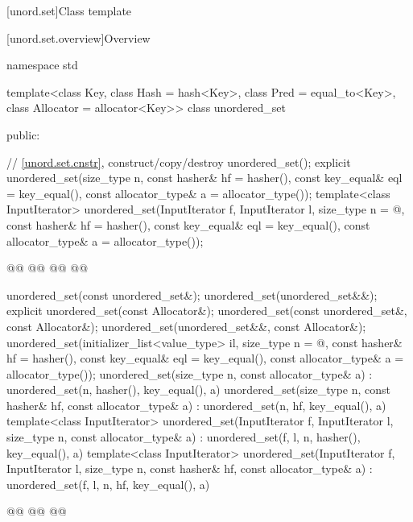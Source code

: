 \documentclass{wg21}
\begin{document}
[unord.set]{Class template }%

[unord.set.overview]{Overview}

%
\begin{codeblock}
namespace std {
template<class Key,
class Hash = hash<Key>,
class Pred = equal_to<Key>,
class Allocator = allocator<Key>>
class unordered_set {
    public:

    // \ref{unord.set.cnstr}, construct/copy/destroy
    unordered_set();
    explicit unordered_set(size_type n,
    const hasher& hf = hasher(),
    const key_equal& eql = key_equal(),
    const allocator_type& a = allocator_type());
    template<class InputIterator>
    unordered_set(InputIterator f, InputIterator l,
        size_type n = @\seebelow@,
        const hasher& hf = hasher(),
        const key_equal& eql = key_equal(),
        const allocator_type& a = allocator_type());

    @@
    @@
    @@
    @@

    unordered_set(const unordered_set&);
    unordered_set(unordered_set&&);
    explicit unordered_set(const Allocator&);
    unordered_set(const unordered_set&, const Allocator&);
    unordered_set(unordered_set&&, const Allocator&);
    unordered_set(initializer_list<value_type> il,
        size_type n = @\seebelow@,
        const hasher& hf = hasher(),
        const key_equal& eql = key_equal(),
        const allocator_type& a = allocator_type());
    unordered_set(size_type n, const allocator_type& a)
    : unordered_set(n, hasher(), key_equal(), a) { }
    unordered_set(size_type n, const hasher& hf, const allocator_type& a)
    : unordered_set(n, hf, key_equal(), a) { }
    template<class InputIterator>
    unordered_set(InputIterator f, InputIterator l, size_type n, const allocator_type& a)
    : unordered_set(f, l, n, hasher(), key_equal(), a) { }
    template<class InputIterator>
    unordered_set(InputIterator f, InputIterator l, size_type n, const hasher& hf,
        const allocator_type& a)
    : unordered_set(f, l, n, hf, key_equal(), a) { }

    @@
    @@
    @@

}}
\end{codeblock}
\end{document}
